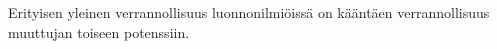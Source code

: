 Erityisen yleinen verrannollisuus luonnonilmiöissä on kääntäen verrannollisuus muuttujan toiseen potenssiin. %
%
%



